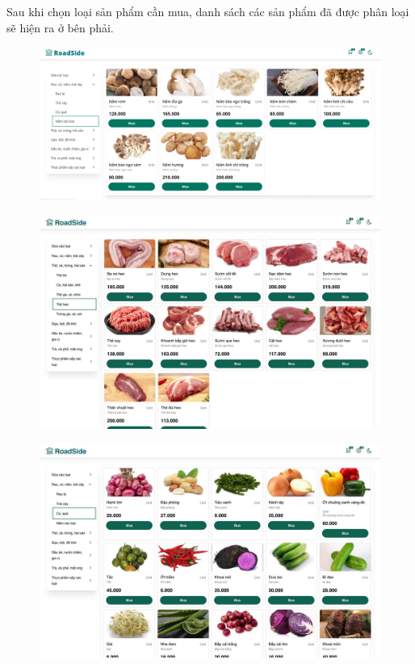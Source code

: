 Sau khi chọn loại sản phẩm cần mua, danh sách các sản phẩm đã được phân loại sẽ hiện ra ở bên phải.
\begin{figure}[H]
    \centering
    \includegraphics[width=1\linewidth] {Images/UI/product_category.png}
\end{figure}
\begin{figure}[H]
    \centering
    \includegraphics[width=1\linewidth] {Images/UI/categories2.png}
\end{figure}
\begin{figure}[H]
    \centering
    \includegraphics[width=1\linewidth] {Images/UI/categories3.png}
\end{figure}
